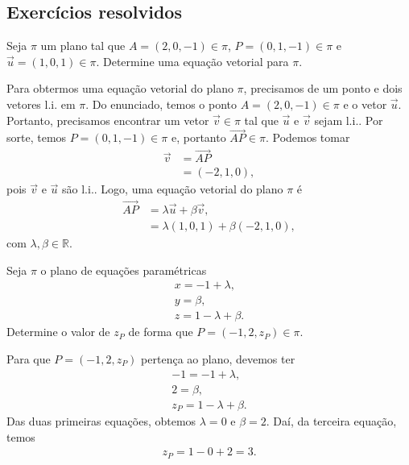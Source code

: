\subsection{Exercícios resolvidos}

\begin{exeresol}
  Seja $\pi$ um plano tal que $A=(2,0,-1)\in\pi$, $P=(0,1,-1)\in\pi$ e $\vec{u}=(1,0,1)\in\pi$. Determine uma equação vetorial para $\pi$.
\end{exeresol}
\begin{resol}
  Para obtermos uma equação vetorial do plano $\pi$, precisamos de um ponto e dois vetores l.i. em $\pi$. Do enunciado, temos o ponto $A=(2,0,-1)\in\pi$ e o vetor $\vec{u}$. Portanto, precisamos encontrar um vetor $\vec{v}\in\pi$ tal que $\vec{u}$ e $\vec{v}$ sejam l.i.. Por sorte, temos $P=(0,1,-1)\in\pi$ e, portanto $\overrightarrow{AP}\in\pi$. Podemos tomar
  \begin{align}
    \vec{v} &= \overrightarrow{AP}\\
            &= (-2,1,0),
  \end{align}
  pois $\vec{v}$ e $\vec{u}$ são l.i.. Logo, uma equação vetorial do plano $\pi$ é
  \begin{align}
    \overrightarrow{AP} &= \lambda\vec{u}+\beta\vec{v},\\
                        &= \lambda (1,0,1) + \beta (-2,1,0),
  \end{align}
  com $\lambda,\beta\in\mathbb{R}$.
\end{resol}

\begin{exeresol}
  Seja $\pi$ o plano de equações paramétricas
  \begin{align}
    x = -1 + \lambda,\\
    y = \beta,\\
    z = 1 - \lambda + \beta.
  \end{align}
  Determine o valor de $z_P$ de forma que $P=(-1,2,z_P)\in\pi$.
\end{exeresol}
\begin{resol}
  Para que $P=(-1,2,z_P)$ pertença ao plano, devemos ter
  \begin{align}
    -1 = -1 + \lambda,\\
    2 = \beta,\\
    z_P = 1 - \lambda + \beta.
  \end{align}
  Das duas primeiras equações, obtemos $\lambda=0$ e $\beta=2$. Daí, da terceira equação, temos
  \begin{align}
    z_P = 1 - 0 + 2 = 3.
  \end{align}
\end{resol}

